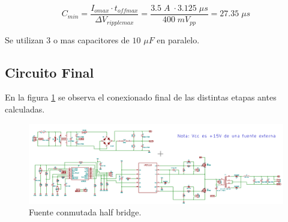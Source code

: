 \documentclass[11pt, a4paper]{article}
\begin{document}
\begin{equation}
C_{min} = \frac{I_{omax} \cdot t_{offmax}}{\Delta V_{ripplemax}} = \frac{3.5 \; A \; \cdot 3.125 \; \mu s}{400 \; mV_{pp}} = 27.35 \; \mu s
\label{CO}
\end{equation} 

Se utilizan 3 o mas capacitores de $10$ $\mu F$ en paralelo.

\subsection{Circuito Final}
En la figura \ref{fuente} se observa el conexionado final de las distintas etapas antes calculadas.

\begin{figure}[H]
	\centering
	\includegraphics[angle = 90, height = 23 cm]{Imagenes/Circuito}
	\caption{Fuente conmutada half bridge.}
	\label{fuente}
\end{figure}
\end{document}
